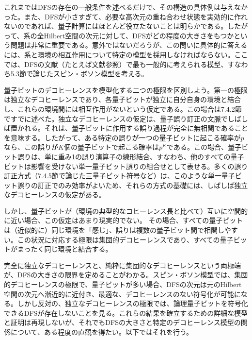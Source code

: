 これまではDFSの存在の一般条件を述べるだけで、その構造の具体例は与えなかった。また、DFSが小さすぎて、必要な高次元の重ね合わせ状態を実効的に作れないのであれば、量子計算にはほとんど役立たないことは明らかである。したがって、系の全Hilbert空間の次元に対して、DFSがどの程度の大きさをもつかという問題は非常に重要である。意外ではないだろうが、この問いに具体的に答えるには、系と環境の相互作用について特定の模型を採用しなければならない。ここでは、DFSの文献（たとえば文献\cite{ref089,ref091,ref093,ref096,ref237}参照）で最も一般的に考えられる模型、すなわち5.3節で論じたスピン・ボソン模型を考える。

量子ビットのデコヒーレンスを模型化する二つの極限を区別しよう。第一の極限は独立なデコヒーレンスであり、各量子ビットが独立に自分自身の環境と結合し、これらの環境間には相互作用がないという仮定である。この場合は7.4.2節ですでに述べた。独立なデコヒーレンスの仮定は、量子誤り訂正の文脈でしばしば置かれる。それは、量子ビットに作用する誤り過程が完全に無相関であることを意味する。したがって、ある特定の誤りが一つの量子ビットに起こる確率が$p$なら、この誤りが$K$個の量子ビットで起こる確率は$p^K$である。この場合、量子ビット誤りは、単に重み1の誤り演算子の線形結合、すなわち、他のすべての量子ビットは影響を受けない単一量子ビット誤りの組合せとして表せる。多くの誤り訂正方式（7.4.5節で論じた三量子ビット符号など）は、このような単一量子ビット誤りの訂正でのみ効率がよいため、それらの方式の基礎には、しばしば独立なデコヒーレンスの仮定がある。

しかし、量子ビットが（環境の典型的なコヒーレンス長と比べて）互いに空間的に近い場合、この仮定はあまり現実的でない。
\hypertarget{srcpage:323}{}\label{srcpage:323}
その場合、すべての量子ビットは（近似的に）同じ環境を「感じ」、誤りは複数の量子ビット間で相関しやすい。この状況に対応する極限は集団的デコヒーレンスであり、すべての量子ビットがまったく同じ環境と結合する。

完全に独立なデコヒーレンスと、純粋に集団的なデコヒーレンスという両極端が、DFSの大きさの限界を定めることがわかる。スピン・ボソン模型では、集団的デコヒーレンスの極限で、量子ビットが多い場合、DFSの次元は元のHilbert空間の次元へ漸近的に近付き、最適な、デコヒーレンスのない符号化が可能になる。しかし反対の、独立なデコヒーレンスの極限では、論理量子ビットを符号化できるDFSが存在しないことを見る。これらの結果を確立するための詳細な模型と証明は再現しないが、それでもDFSの大きさと特定のデコヒーレンス模型の関係について、ある程度の直観を得たい。以下ではそれを行う。


